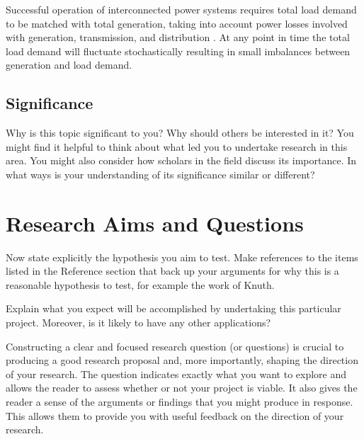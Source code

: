 \documentclass[12pt, a4paper]{article}
\begin{document}
Successful operation of interconnected power systems requires total load demand to be matched with total generation, taking into account power losses involved with generation, transmission, and distribution \cite{Wood2013}. At any point in time the total load demand will fluctuate stochastically resulting in small imbalances between generation and load demand.

\subsection{Significance}
Why is this topic significant to you? Why should others be interested in it? You might find it helpful to think about what led you to undertake research in this area. You might also consider how scholars in the field discuss its importance. In what ways is your understanding of its significance similar or different?


\section{Research Aims and Questions}
Now state explicitly the hypothesis you aim to test. Make references to the items listed in the Reference section that back up your arguments for why this is a reasonable hypothesis to test, for example the work of Knuth.

Explain what you expect will be accomplished by undertaking this particular project.  Moreover, is it likely to have any other applications?

Constructing a clear and focused research question (or questions) is crucial to producing a good research proposal and, more importantly, shaping the direction of your research. The question indicates exactly what you want to explore and allows the reader to assess whether or not your project is viable. It also gives the reader a sense of the arguments or findings that you might produce in response. This allows them to provide you with useful feedback on the direction of your research.
\end{document}
